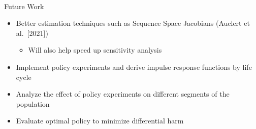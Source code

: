 \documentclass[
  letterpaper,
  DIV=11,
  numbers=noendperiod]{scrartcl}
\makeatletter
\let\oldparagraph\paragraph
\renewcommand{\paragraph}{
    \@ifstar
      \xxxParagraphStar
      \xxxParagraphNoStar
  }
\newcommand{\xxxParagraphStar}[1]{\oldparagraph*{#1}\mbox{}}
\newcommand{\xxxParagraphNoStar}[1]{\oldparagraph{#1}\mbox{}}
\providecommand{\tightlist}{%
  \setlength{\itemsep}{0pt}\setlength{\parskip}{0pt}}\usepackage{longtable,booktabs,array}
\makeatother
\begin{document}
\paragraph{Future Work}\label{future-work}

\begin{itemize}
\tightlist
\item
  Better estimation techniques such as Sequence Space Jacobians (Auclert
  et al.~{[}2021{]})

  \begin{itemize}
  \tightlist
  \item
    Will also help speed up sensitivity analysis
  \end{itemize}
\item
  Implement policy experiments and derive impulse response functions by
  life cycle
\item
  Analyze the effect of policy experiments on different segments of the
  population
\item
  Evaluate optimal policy to minimize differential harm
\end{itemize}
\end{document}
